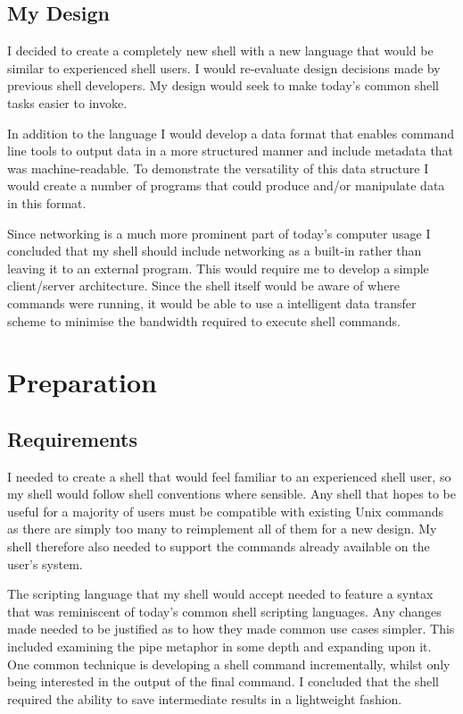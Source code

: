 \documentclass[12pt,twoside,notitlepage]{report}
\begin{document}
\section{My Design}
I decided to create a completely new shell with a new
language that would be similar to experienced shell users. I would
re-evaluate design decisions made by previous shell developers. My
design would seek to make today's common shell tasks easier to invoke.

In addition to the language I would develop a data format that enables
command line tools to output data in a more structured manner and
include metadata that was machine-readable. To demonstrate the
versatility of this data structure I would create a number of programs
that could produce and/or manipulate data in this format.

Since networking is a much more prominent part of today's computer usage
I concluded that my shell should include networking as a built-in
rather than leaving it to an external program. This would require me
to develop a simple client/server architecture. Since the shell itself
would be aware of where commands were running, it would be able to use
a intelligent data transfer scheme to minimise the bandwidth required
to execute shell commands.

\cleardoublepage

\chapter{Preparation}

\section{Requirements}
I needed to create a shell that would feel familiar to an experienced
shell user, so my shell would follow shell conventions where
sensible. Any shell that hopes to be useful for a majority of users
must be compatible with existing Unix commands as there are simply too
many to reimplement all of them for a new design. My shell therefore
also needed to support the commands already available on the user's
system.

The scripting language that my shell would accept needed to feature a
syntax that was reminiscent of today's common shell scripting
languages.  Any changes made needed to be justified as to how they
made common use cases simpler. This included examining the pipe
metaphor in some depth and expanding upon it. One common technique is
developing a shell command incrementally, whilst only being interested
in the output of the final command. I concluded that the shell
required the ability to save intermediate results in a lightweight
fashion.
\end{document}

